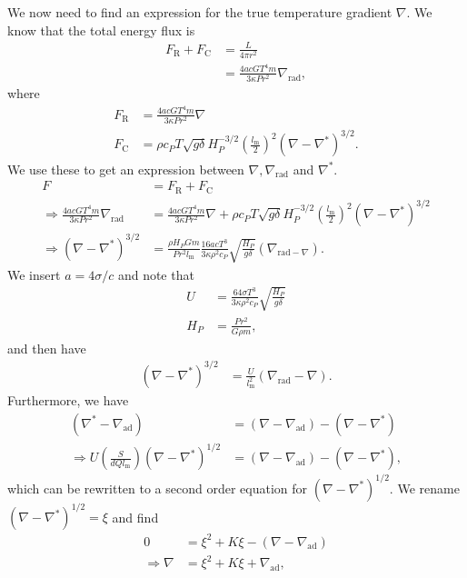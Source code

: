 \documentclass[a4paper, 11pt, english]{article}
\begin{document}
We now need to find an expression for the true temperature gradient $\nabla$.
We know that
the total energy flux is
\begin{align*}
	F_{\mathrm{R}} + F_{\mathrm{C}} &= \frac{L}{4\pi r^2} \\
	&= \frac{4 a c G T^4 m}{3 \kappa Pr^2}\nabla_{\mathrm{rad}},
\end{align*}
where
\begin{align*}
	F_{\mathrm{R}} &= \frac{4acGT^4m}{3 \kappa P r^2} \nabla \\
	F_{\mathrm{C}} &= \rho c_P T \sqrt{g \delta} H_P^{-3/2} \left(
	\frac{l_{\mathrm{m}}}{2} \right)^2 (\nabla - \nabla^*)^{3/2}.
\end{align*}
We use these to get an expression between $\nabla, \nabla_{\mathrm{rad}}$ and $\nabla^*$.
\begin{align*}
	F &= F_{\mathrm{R}} + F_{\mathrm{C}} \\
	\Rightarrow \frac{4 a c G T^4 m}{3 \kappa Pr^2}\nabla_{\mathrm{rad}} &=
	\frac{4acGT^4m}{3 \kappa P r^2} \nabla + \rho c_P T \sqrt{g \delta}
	H_P^{-3/2} \left(
	\frac{l_{\mathrm{m}}}{2} \right)^2 (\nabla - \nabla^*)^{3/2}\\
	\Rightarrow (\nabla - \nabla^*)^{3/2} &= \frac{\rho H_P G m}{Pr^2
	l_{\mathrm{m}}} \frac{16acT^3}{3 \kappa \rho^2 c_P}
	\sqrt{\frac{H_P}{g \delta}}(\nabla_{\mathrm{rad} - \nabla}).
\end{align*}
We insert $a = 4 \sigma / c$ and note that
\begin{align*}
	U &= \frac{64 \sigma T^3}{3 \kappa \rho^2 c_P} \sqrt{\frac{H_P}{g \delta}} \\
	H_P &= \frac{Pr^2}{G \rho m},
\end{align*}
and then have
\begin{align*}
	(\nabla - \nabla^*)^{3/2} &= \frac{U}{l_{\mathrm{m}}^2}(\nabla_{\mathrm{rad}} -
	\nabla).
\end{align*}
Furthermore, we have 
\begin{align*}
	(\nabla^* - \nabla_{\mathrm{ad}}) &= (\nabla - \nabla_{\mathrm{ad}}) - (\nabla -
	\nabla^*) \\
	\Rightarrow U\left( \frac{S}{d Q l_{\mathrm{m}}} \right) (\nabla - \nabla^*)^{1/2} &=
	(\nabla - \nabla_{\mathrm{ad}}) - (\nabla - \nabla^*),
\end{align*}
which can be rewritten to a second order equation for $(\nabla - \nabla^*)^{1/2}$. We
rename $(\nabla - \nabla^*)^{1/2} = \xi$ and find
\begin{align}
	0 &= \xi^2 + K\xi - (\nabla - \nabla_{\mathrm{ad}}) \nonumber \\
	\Rightarrow \nabla &= \xi^2 + K\xi + \nabla_{\mathrm{ad}} \label{eq:nabla_real},
\end{align}
\end{document}

